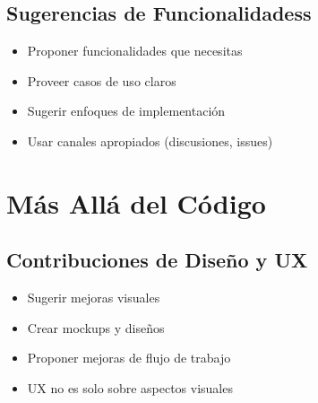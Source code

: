 \documentclass{presentacion}
\begin{document}
\subsection{Sugerencias de Funcionalidadess}
\begin{frame}
    \begin{itemize}[<+->]
        \item Proponer funcionalidades que necesitas
        \item Proveer casos de uso claros
        \item Sugerir enfoques de implementación
        \item Usar canales apropiados (discusiones, issues)
    \end{itemize}
    
    \vspace{1em}
\end{frame}

\section{Más Allá del Código}

\subsection{Contribuciones de Diseño y UX}
\begin{frame}
    \begin{itemize}[<+->]
        \item Sugerir mejoras visuales
        \item Crear mockups y diseños
        \item Proponer mejoras de flujo de trabajo
        \item UX no es solo sobre aspectos visuales
    \end{itemize}
    
    \vspace{1em}
\end{frame}
\end{document}
